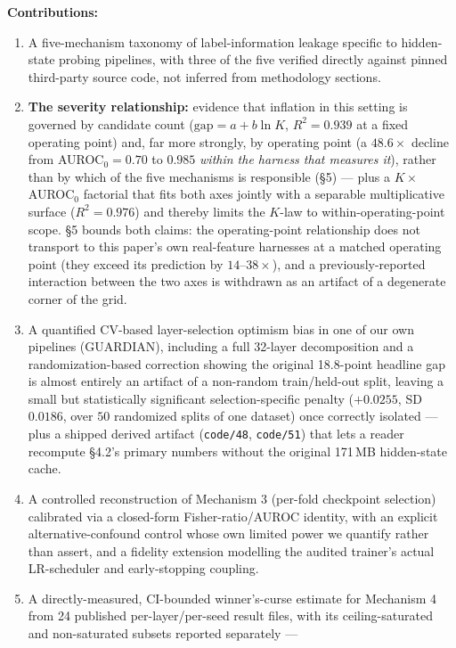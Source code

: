 \documentclass[10pt]{article} %
\begin{document}
\textbf{Contributions:}
\begin{enumerate}
\item A five-mechanism taxonomy of label-information leakage specific to
   hidden-state probing pipelines, with three of the five verified
   directly against pinned third-party source code, not inferred from
   methodology sections.
\item \textbf{The severity relationship:} evidence that inflation in this
   setting is governed by candidate count ($\text{gap}=a+b\ln K$,
   $R^2=0.939$ at a fixed operating point) and, far more strongly, by
   operating point (a $48.6\times$ decline from AUROC$_0=0.70$ to $0.985$
   \emph{within the harness that measures it}), rather than by which of the
   five mechanisms is responsible (§5) --- plus a $K\times$AUROC$_0$
   factorial that fits both axes jointly with a separable multiplicative
   surface ($R^2=0.976$) and thereby limits the $K$-law to
   within-operating-point scope. §5 bounds both claims: the operating-point
   relationship does not transport to this paper's own real-feature harnesses
   at a matched operating point (they exceed its prediction by
   $14$--$38\times$), and a previously-reported interaction between the two
   axes is withdrawn as an artifact of a degenerate corner of the grid.
\item A quantified CV-based layer-selection optimism bias in one of our
   own pipelines (GUARDIAN), including a full 32-layer decomposition and
   a randomization-based correction showing the original 18.8-point
   headline gap is almost entirely an artifact of a non-random
   train/held-out split, leaving a small but statistically significant
   selection-specific penalty ($+0.0255$, SD $0.0186$, over $50$ randomized
   splits of one dataset) once correctly isolated --- plus a shipped derived
   artifact (\texttt{code/48}, \texttt{code/51}) that lets a reader recompute
   §4.2's primary numbers without the original 171\,MB hidden-state cache.
\item A controlled reconstruction of Mechanism 3 (per-fold checkpoint
   selection) calibrated via a closed-form Fisher-ratio/AUROC identity,
   with an explicit alternative-confound control whose own limited power
   we quantify rather than assert, and a fidelity extension modelling the
   audited trainer's actual LR-scheduler and early-stopping coupling.
\item A directly-measured, CI-bounded winner's-curse estimate for
   Mechanism 4 from 24 published per-layer/per-seed result files, with
   its ceiling-saturated and non-saturated subsets reported separately ---

\end{enumerate}
\end{document}
